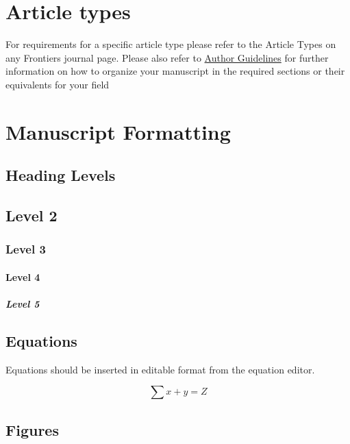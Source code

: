 \documentclass[utf8]{frontiersSCNS} %
\begin{document}
\section{Article types}

For requirements for a specific article type please refer to the
Article Types on any Frontiers journal page. Please also refer to
\href{http://home.frontiersin.org/about/author-guidelines#Sections}{Author
  Guidelines} for further information on how to organize your
manuscript in the required sections or their equivalents for your
field


\section{Manuscript Formatting}

\subsection{Heading Levels}


\subsection{Level 2}
\subsubsection{Level 3}
\paragraph{Level 4}
\subparagraph{Level 5}

\subsection{Equations}
Equations should be inserted in editable format from the equation editor.

\begin{equation}
\sum x+ y =Z\label{eq:01}
\end{equation}

\subsection{Figures}
\end{document}
